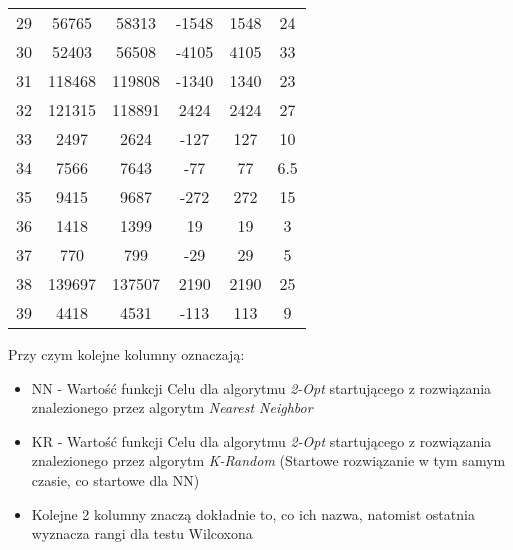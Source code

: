 \documentclass{article}
\begin{document}
\begin{table}[h!]
\begin{tabular}{c||c|c||c|c||c}
29 & 56765 & 58313 & -1548 & 1548 & 24 \\
30 & 52403 & 56508 & -4105 & 4105 & 33 \\
31 & 118468 & 119808 & -1340 & 1340 & 23 \\
32 & 121315 & 118891 & 2424 & 2424 & 27 \\
33 & 2497 & 2624 & -127 & 127 & 10 \\
34 & 7566 & 7643 & -77 & 77 & 6.5 \\
35 & 9415 & 9687 & -272 & 272 & 15 \\
36 & 1418 & 1399 & 19 & 19 & 3 \\
37 & 770 & 799 & -29 & 29 & 5 \\
38 & 139697 & 137507 & 2190 & 2190 & 25 \\
39 & 4418 & 4531 & -113 & 113 & 9 \\
\end{tabular}
\end{table}

Przy czym kolejne kolumny oznaczają:
\begin{itemize}
	\item NN - Wartość funkcji Celu dla algorytmu \textit{2-Opt} startującego z rozwiązania znalezionego przez algorytm \textit{Nearest Neighbor}
	\item KR - Wartość funkcji Celu dla algorytmu \textit{2-Opt} startującego z rozwiązania znalezionego przez algorytm \textit{K-Random} (Startowe rozwiązanie w tym samym czasie, co startowe dla NN)
	\item Kolejne 2  kolumny znaczą dokładnie to, co ich nazwa, natomist ostatnia wyznacza rangi dla testu Wilcoxona
\end{itemize}
\end{document}
